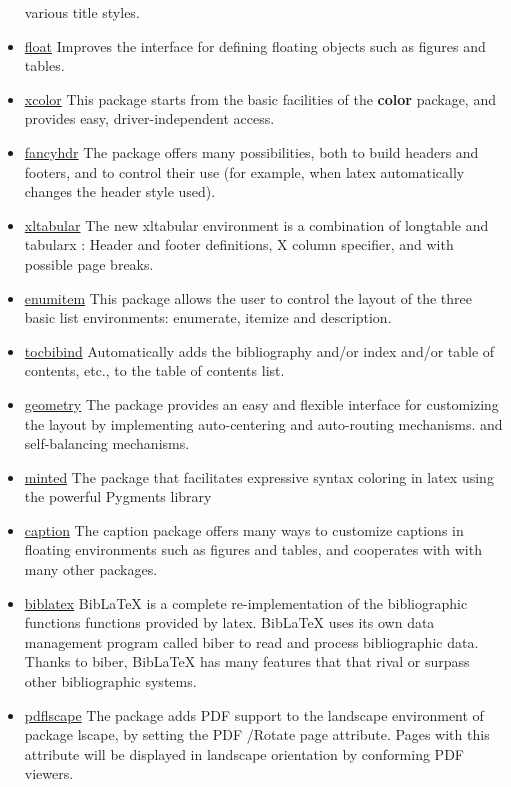 \begin{itemize}
          various title styles.
    \item \href{https://www.ctan.org/pkg/float}{float} Improves the interface for defining floating objects
          such as figures and tables.
    \item \href{https://www.ctan.org/pkg/xcolor}{xcolor} This package starts from the basic facilities
          of the \textbf{color} package, and provides easy, driver-independent access. \label{color}
    \item \href{https://www.ctan.org/pkg/fancyhdr}{fancyhdr} The package offers many possibilities,
          both to build headers and footers, and to control their use (for example, when \gls{latex} automatically changes the header style used).
    \item \href{https://www.ctan.org/pkg/xltabular}{xltabular} The new xltabular environment is a combination
          of longtable and tabularx : Header and footer definitions, X column specifier,
          and with possible page breaks.
    \item \href{https://www.ctan.org/pkg/enumitem}{enumitem} This package allows the user to control
          the layout of the three basic list environments: enumerate, itemize and description.
    \item \href{https://www.ctan.org/pkg/tocbibind}{tocbibind} Automatically adds the bibliography and/or
          index and/or table of contents, etc., to the table of contents list.
    \item \href{https://www.ctan.org/pkg/geometry}{geometry} The package provides an easy and flexible
          interface for customizing the layout by implementing auto-centering and auto-routing mechanisms.
          and self-balancing mechanisms.
    \item \href{https://www.ctan.org/pkg/minted}{minted} The package that facilitates expressive syntax coloring in
          \gls{latex} using the powerful Pygments library
    \item \href{https://www.ctan.org/pkg/caption}{caption} The caption package offers many ways to customize captions
          in floating environments such as figures and tables, and cooperates with with many other packages.
    \item \href{https://www.ctan.org/pkg/biblatex}{biblatex} BibLaTeX is a complete re-implementation of the bibliographic functions
          functions provided by \gls{latex}. BibLaTeX uses its own data management program called biber
          to read and process bibliographic data. Thanks to biber, BibLaTeX has many features that
          that rival or surpass other bibliographic systems.
    \item \href{https://ctan.org/pkg/pdflscape}{pdflscape} The package adds PDF support to the landscape
          environment of package lscape, by setting the PDF /Rotate page attribute. Pages with this attribute will be displayed
          in landscape orientation by conforming PDF viewers.
\end{itemize}

